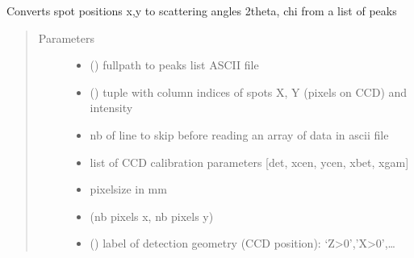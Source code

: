\documentclass[letterpaper,10pt,english]{sphinxmanual}
\begin{document}
\begin{fulllineitems}
\label{\detokenize{Simulation_Module:LaueTools.LaueGeometry.Compute_data2thetachi}}
Converts spot positions x,y to scattering angles 2theta, chi from a list of peaks
\begin{quote}\begin{description}
\item[{Parameters}] \leavevmode\begin{itemize}
\item {} 
 () \textendash{} fullpath to peaks list ASCII file

\item {} 
 () \textendash{} tuple with column indices of spots X, Y (pixels on CCD) and intensity

\item {} 
 \textendash{} nb of line to skip before reading an array of data in ascii file

\item {} 
 \textendash{} list of CCD calibration parameters {[}det, xcen, ycen, xbet, xgam{]}

\item {} 
 \textendash{} pixelsize in mm

\item {} 
 \textendash{} (nb pixels x, nb pixels y)

\item {} 
 () \textendash{} label of detection geometry (CCD position): ‘Z\textgreater{}0’,’X\textgreater{}0’,…


\end{itemize}
\end{description}
\end{quote}
\end{fulllineitems}
\end{document}
